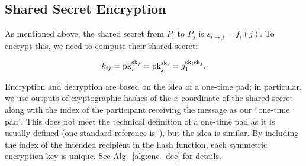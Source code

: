 \subsection{Shared Secret Encryption}
\label{ssec:secret_enc}

As mentioned above, the shared secret from
$P_{i}$ to $P_{j}$ is $s_{i\to j} = f_{i}(j)$.
To encrypt this, we need to compute their shared secret:

\begin{equation}
    k_{ij} = \textrm{pk}_{i}^{\textrm{sk}_{j}} = \textrm{pk}_{j}^{\textrm{sk}_{i}} = 
    g_{1}^{\textrm{sk}_{i}\textrm{sk}_{j}}.
\end{equation}

\noindent
Encryption and decryption are based on the idea of a one-time pad;
in particular, we use outputs of cryptographic hashes of
the $x$-coordinate of the shared secret along with the index
of the participant receiving the message as our ``one-time pad''.
This does not meet the technical definition of a one-time pad
as it is usually defined (one standard reference is~\cite{hac1996}),
but the idea is similar.
By including the index of the intended recipient in the hash function,
each symmetric encryption key is unique.
See Alg.~\ref{alg:enc_dec} for details.




